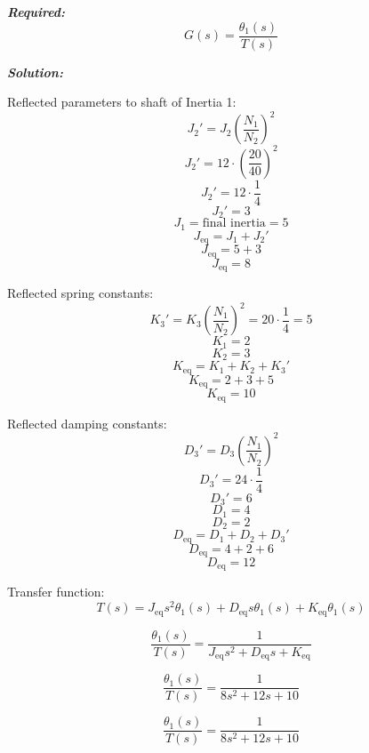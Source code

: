 ﻿\documentclass[11pt]{article}
\begin{document}
\vspace{12pt}

\noindent \textbf{\textit{Required:}}
\[
G(s) = \frac{\theta_1(s)}{T(s)}
\]

\vspace{12pt}


\noindent\textbf{\textit{Solution:}}

Reflected parameters to shaft of Inertia 1:
\[
J_2' = J_2 \left( \frac{N_1}{N_2} \right)^2 
\]
\[
J_2' = 12 \cdot \left( \frac{20}{40} \right)^2 
\]
\[
J_2' = 12 \cdot \frac{1}{4} 
\]
\[
J_2' = 3
\]
\[
J_1 = \text{final inertia} = 5
\]
\[
J_{\text{eq}} = J_1 + J_2' 
\]
\[
J_{\text{eq}} = 5 + 3 
\]
\[
J_{\text{eq}} = 8
\]

Reflected spring constants:
\[
K_3' = K_3 \left( \frac{N_1}{N_2} \right)^2 = 20 \cdot \frac{1}{4} = 5
\]
\[
K_1 = 2
\]
\[
K_2 = 3
\]
\[
K_{\text{eq}} = K_1 + K_2 + K_3' 
\]
\[
K_{\text{eq}} = 2 + 3 + 5 
\]
\[
K_{\text{eq}} = 10
\]

Reflected damping constants:
\[
D_3' = D_3 \left( \frac{N_1}{N_2} \right)^2 
\]
\[
D_3' = 24 \cdot \frac{1}{4} 
\]
\[
D_3' = 6
\]
\[
D_1 = 4
\]
\[
D_2 = 2
\]
\[
D_{\text{eq}} = D_1 + D_2 + D_3' 
\]
\[
D_{\text{eq}} = 4 + 2 + 6 
\]
\[
D_{\text{eq}} = 12
\]

Transfer function:
\[
T(s) = J_{\text{eq}} s^2 \theta_1(s) + D_{\text{eq}} s \theta_1(s) + K_{\text{eq}} \theta_1(s)
\]

\[
\frac{\theta_1(s)}{T(s)} = \frac{1}{J_{\text{eq}} s^2 + D_{\text{eq}} s + K_{\text{eq}}}
\]

\[
\frac{\theta_1(s)}{T(s)} = \frac{1}{8 s^2 + 12 s + 10}
\]

\[
\boxed{\frac{\theta_1(s)}{T(s)} = \frac{1}{8 s^2 + 12 s + 10}}
\]

\end{document}
